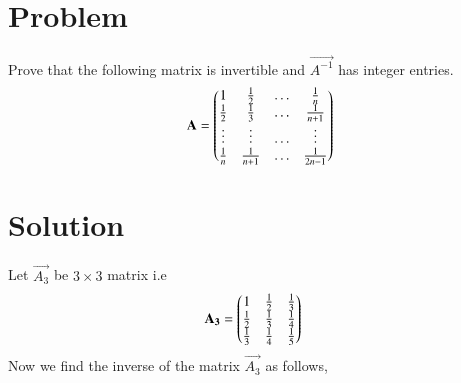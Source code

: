 \documentclass[journal,12pt,twocolumn]{IEEEtran}
\begin{document}
\section{\textbf{Problem}}
Prove that the following matrix is invertible and $\vec{A^{-1}}$ has integer entries.\\
\begin{align*}
\mathbf{A} = \begin{pmatrix}1&\frac{1}{2}&\dots&\frac{1}{n}\\\frac{1}{2}&\frac{1}{3}&\dots&\frac{1}{n+1}\\\vdots&\vdots&\dots&\vdots\\\frac{1}{n}&\frac{1}{n+1}&\dots&\frac{1}{2n-1}\end{pmatrix}
\end{align*}
\section{\textbf{Solution}}
\begin{comment}
Let $\vec{H_n}$ be the $n$-th Hilbert matrix given by
\begin{align}
\vec{H_n} &= \left[\frac1{i+j-1}\right]_{i,j}\\
\intertext{Then $\vec{H_{n+1}}$ is given by,}
\vec{H_{n+1}} &= \myvec{\vec{H_n}&\vec{u}\\\vec{u^T}&\frac{1}{2n-1}}
\end{align}
\end{comment}
Let $\vec{A_3}$ be $3 \times 3$ matrix i.e
\begin{align}
\mathbf{A_3} &= \begin{pmatrix}1&\frac{1}{2}&\frac{1}{3}\\\frac{1}{2}&\frac{1}{3}&\frac{1}{4}\\\frac{1}{3}&\frac{1}{4}&\frac{1}{5}\end{pmatrix}
\end{align}
Now we find the inverse of the matrix $\vec{A_3}$ as follows,
\end{document}
